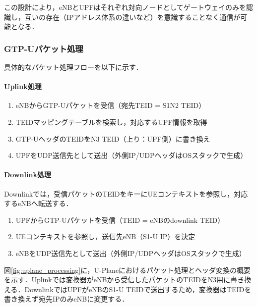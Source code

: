 この設計により，eNBとUPFはそれぞれ対向ノードとしてゲートウェイのみを認識し，互いの存在（IPアドレス体系の違いなど）を意識することなく通信が可能となる．

\subsubsection{GTP-Uパケット処理}
具体的なパケット処理フローを以下に示す．

\paragraph{Uplink処理}
\begin{enumerate}
\item eNBからGTP-Uパケットを受信（宛先TEID = S1N2 TEID）
\item TEIDマッピングテーブルを検索し，対応するUPF情報を取得
\item GTP-UヘッダのTEIDをN3 TEID（上り：UPF側）に書き換え
\item UPFをUDP送信先として送出（外側IP/UDPヘッダはOSスタックで生成）
\end{enumerate}

\paragraph{Downlink処理}
Downlinkでは，受信パケットのTEIDをキーにUEコンテキストを参照し，対応するeNBへ転送する．
\begin{enumerate}
\item UPFからGTP-Uパケットを受信（TEID = eNBのdownlink TEID）
\item UEコンテキストを参照し，送信先eNB（S1-U IP）を決定
\item eNBをUDP送信先として送出（外側IP/UDPヘッダはOSスタックで生成）
\end{enumerate}

図\ref{fig:uplane_processing}に，U-Planeにおけるパケット処理とヘッダ変換の概要を示す．Uplinkでは変換器がeNBから受信したパケットのTEIDをN3用に書き換える．DownlinkではUPFがeNBのS1-U TEIDで送出するため，変換器はTEIDを書き換えず宛先IPのみeNBに変更する．

